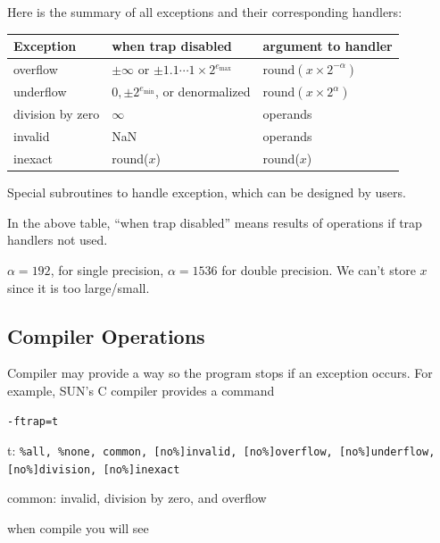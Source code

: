 \newpage

Here is the summary of all exceptions and their corresponding handlers:
\begin{center}
    \begin{tabular}{lll}
    Exception & when trap disabled & argument to handler\\
    \hline
    overflow & $\pm \infty $ or $\pm 1.1\cdots 1 \times
    2^{e_{\max}}$ & 
    $\mbox{round}(x \times 2^{-\alpha})$\\
    underflow & $0, \pm 2^{e_{\min}}$, or denormalized 
    & $\mbox{round}(x \times 2^{\alpha})$ \\
    division by zero & $\infty$ 
    & operands \\
    invalid & NaN & operands \\
    inexact & round($x$) &  round($x$)
    \end{tabular}
\end{center}

\begin{definition}
    Special subroutines to handle exception, which can be designed by users.
\end{definition}

In the above table, “when trap disabled” means results of operations if trap handlers not used.

\begin{eg}
    $\alpha = 192$, for single precision, $\alpha = 1536$ for double precision. We can't store $x$ since it is too large/small.
\end{eg}

\subsection{Compiler Operations}

Compiler may provide a way so the program stops if an exception occurs. For example, SUN's C compiler provides a command

\begin{verbatim}
-ftrap=t
\end{verbatim}
t: \texttt{\%all, \%none, common, [no\%]invalid, [no\%]overflow, [no\%]underflow, [no\%]division, [no\%]inexact}

\begin{note}
    common: invalid, division by zero, and overflow
\end{note}

when compile you will see 

